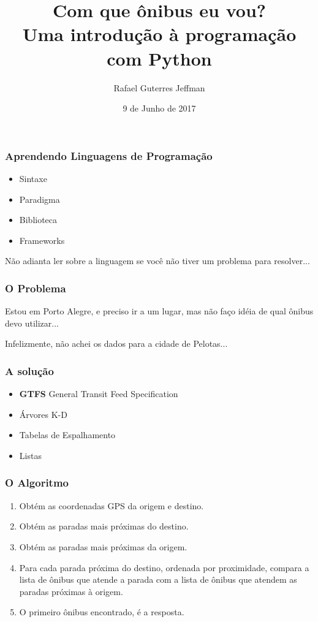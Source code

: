 \documentclass[aspectratio=169,14pt]{beamer}
\title{Com que ônibus eu vou? \\ \large{Uma introdução à programação com Python}}
\author{Rafael Guterres Jeffman}
\institute{Faculdade Senac Porto Alegre \\ Tchelinux}
\date{9 de Junho de 2017}
\begin{document}
\begin{frame}
    \titlepage
\end{frame}

\begin{frame}
    \frametitle{Aprendendo Linguagens de Programação}
    \begin{itemize}
        \item Sintaxe
        \item Paradigma
        \item Biblioteca
        \item Frameworks
    \end{itemize}
\end{frame}

\begin{frame}
    \begin{center}
    Não adianta ler sobre a linguagem  se você não tiver um problema
    para resolver...
    \end{center}
\end{frame}

\begin{frame}
    \frametitle{O Problema}
    
    \vfill
    \begin{center}
        Estou em Porto Alegre, e preciso ir a um lugar, mas não faço
        idéia de qual ônibus devo utilizar...
    \end{center}
    \vfill
    \vfill
    \hfill
    \tiny{Infelizmente, não achei os dados para a cidade de Pelotas...}
\end{frame}

\begin{frame}
    \frametitle{A solução}
    \begin{itemize}
        \setlength\itemsep{1em}
        \item \textbf{GTFS} General Transit Feed Specification
        \item Árvores K-D
        \item Tabelas de Espalhamento
        \item Listas
    \end{itemize}
\end{frame}

\begin{frame}
    \frametitle{O Algoritmo}
    \vfill
    \small \begin{enumerate}
        \item Obtém as coordenadas GPS da origem e destino.
        \item Obtém as paradas mais próximas do destino.
        \item Obtém as paradas mais próximas da origem.
        \item Para cada parada próxima do destino, ordenada por
        proximidade, compara a lista de ônibus que atende a parada com
        a lista de ônibus que atendem as paradas próximas à origem.
        \item O primeiro ônibus encontrado, é a resposta.
    \end{enumerate}
\end{frame}
\end{document}
